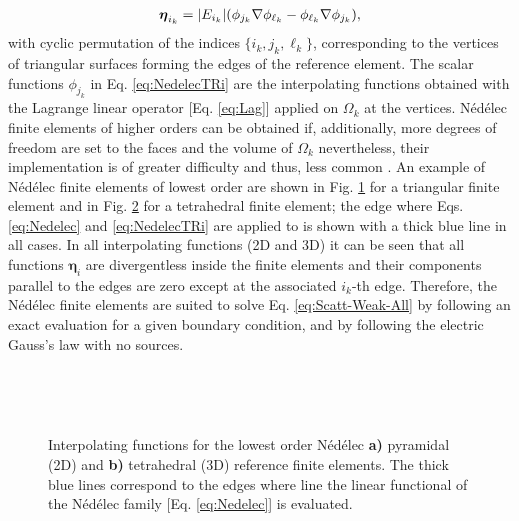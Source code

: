 %
\begin{align}
    \boldsymbol{\eta}_{i_k} = \abs{E_{i_k}} \qty(\phi_{j_k}\nabla\phi_{\ell_k}
                                                    - \phi_{\ell_k}\nabla\phi_{j_k} ),
    \label{eq:NedelecTRi}
\end{align}
%
with cyclic permutation of the indices $\{i_k, j_k, \ell_k\}$, corresponding to the vertices of triangular surfaces forming  the edges of the reference element. The scalar functions $\phi_{j_k}$ in Eq. \eqref{eq:NedelecTRi}  are the interpolating functions obtained with the Lagrange linear operator [Eq. \eqref{eq:Lag}] applied on $\Omega_k$ at the vertices. Nédélec finite elements of higher orders can be obtained if, additionally, more degrees of freedom are set to the faces and the volume of $\Omega_k$ \cite{bergot_generation_2010} nevertheless, their implementation is of greater difficulty and thus, less common \cite{larson_finite_2013,jin_theory_2010}. An example of Nédélec finite elements of lowest order are shown in Fig. \ref{fig:Nedelec:a} for a triangular finite element and in Fig. \ref{fig:Nedelec:b} for a tetrahedral finite element; the edge where Eqs. \eqref{eq:Nedelec} and \eqref{eq:NedelecTRi} are applied to is shown with a thick blue line in all cases. In all interpolating functions (2D and 3D) it can be seen that all functions $\boldsymbol{\eta}_i$ are divergentless inside the finite elements and their components parallel to the edges are zero except at the associated $i_k$-th edge. Therefore, the Nédélec finite elements are suited to solve Eq. \eqref{eq:Scatt-Weak-All}  by following an exact evaluation for a given boundary condition, and by following the electric Gauss's law with no sources.

\begin{figure}[t!]
    \hspace*{-.7\textwidth}
    \vspace*{7.5em}%
     \begin{subfigure}{\textwidth}\caption{ }\label{fig:Nedelec:a}\end{subfigure}\\
    \hspace*{-.7\textwidth}
     \begin{subfigure}{\textwidth}\caption{ }\label{fig:Nedelec:b}\end{subfigure}
     \vspace*{-11.5em}\\
    \centering
    \scriptsize
    \def\svgwidth{.875\textwidth}
\caption[Pyramidal and Tetrahedral Nédélec Finite Element Family of lowest Order]{Interpolating functions for the lowest order Nédélec \textbf{a)} pyramidal (2D) and \textbf{b)} tetrahedral (3D) reference finite elements. The thick blue lines correspond to the edges where line the linear functional of the Nédélec family [Eq. \eqref{eq:Nedelec}] is evaluated.}
\label{fig:Nedelec}
\end{figure}
